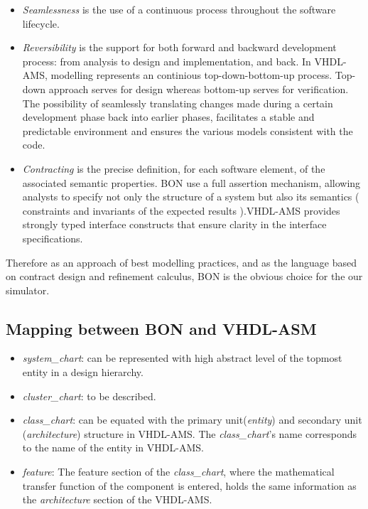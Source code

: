 \documentclass{article}
\newcommand{\todo}{\textbf{TODO:}}
\newcommand{\Sc}{\emph{system\_chart}\xspace}
\newcommand{\Clc}{\emph{cluster\_chart}\xspace}
\newcommand{\Csc}{\emph{class\_chart}\xspace}
\newcommand{\Ft}{\emph{feature}\xspace}
\newcommand{\ent}{\emph{entity}\xspace}
\newcommand{\arch}{\emph{architecture}\xspace}
\begin{document}
\begin{itemize}
\item \emph{Seamlessness} is the use of a continuous process throughout the software lifecycle.
\item \emph{Reversibility} is the support for both forward and backward development process: from analysis to
design and implementation, and back.
In VHDL-AMS, modelling represents an continious top-down-bottom-up process. Top-down approach serves for design whereas bottom-up
serves for verification.
The possibility of seamlessly translating changes made during a certain development phase back into earlier phases,
facilitates a stable and predictable environment and ensures the various models consistent with the code.


\item \emph{Contracting} is the precise definition, for each software element, of the associated semantic properties. 
BON use a full assertion mechanism, allowing analysts to specify not only the structure of a system but also its
semantics ( constraints and invariants of the expected results ).VHDL-AMS provides strongly typed interface constructs 
that ensure clarity in the interface specifications. 

\end{itemize}



Therefore as an approach of best modelling practices, and as the language based on contract design 
and refinement calculus, BON is the obvious choice for the our simulator.

\subsection{Mapping between BON and VHDL-ASM}
\begin{itemize}
\item \Sc: can be represented with high abstract level of the topmost entity in a design hierarchy.
\item \Clc: to be described.
\item \Csc: can be equated with the primary unit(\ent) and secondary unit (\arch) structure in VHDL-AMS.
The \Csc's name corresponds to the name of the entity in VHDL-AMS.
\item \Ft: The feature section of the \Csc, where the mathematical transfer function of the component
is entered, holds the same information as the \arch section of the VHDL-AMS.
\end{itemize}
\end{document}
